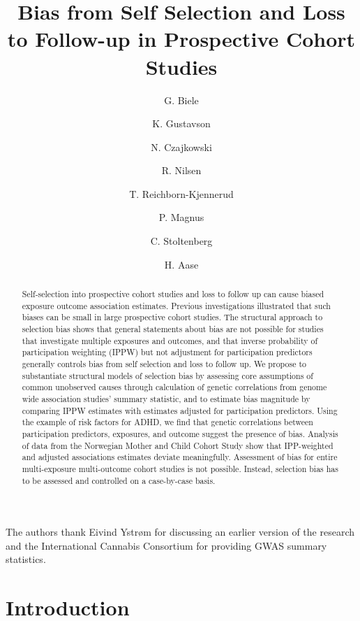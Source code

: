 \documentclass[12pt]{article}
\title{Bias from Self Selection and Loss to Follow-up in Prospective Cohort Studies}
\author{G. Biele \and K. Gustavson \and N. Czajkowski \and R. Nilsen \and T. Reichborn-Kjennerud \and P. Magnus \and C. Stoltenberg \and H. Aase}
\begin{document}
		\begin{titlepage}
			\maketitle
			\begin{abstract}
				Self-selection into prospective cohort studies and loss to follow up can cause biased exposure outcome association estimates. Previous investigations illustrated that such biases can be small in large prospective cohort studies. The structural approach to selection bias shows that general statements about bias are not possible for studies that investigate multiple exposures and outcomes, and that inverse probability of participation weighting (IPPW) but not adjustment for participation predictors generally controls bias from self selection and loss to follow up. We propose to substantiate structural models of selection bias by assessing core assumptions of common unobserved causes through calculation of genetic correlations from genome wide association studies' summary statistic, and to estimate bias magnitude by comparing IPPW estimates with estimates adjusted for participation predictors. Using the example of risk factors for ADHD, we find that genetic correlations between participation predictors,  exposures, and outcome suggest the presence of bias. Analysis of data from the Norwegian Mother and Child Cohort Study show that IPP-weighted and adjusted associations estimates deviate meaningfully. Assessment of bias for entire multi-exposure multi-outcome cohort studies is not possible. Instead, selection bias has to be assessed and controlled on a case-by-case basis.
			\end{abstract}
			
			
			The authors thank Eivind Ystrøm for discussing an earlier version of the research and the International Cannabis Consortium for providing GWAS summary statistics.
		\end{titlepage}


\section{Introduction}
\end{document}

